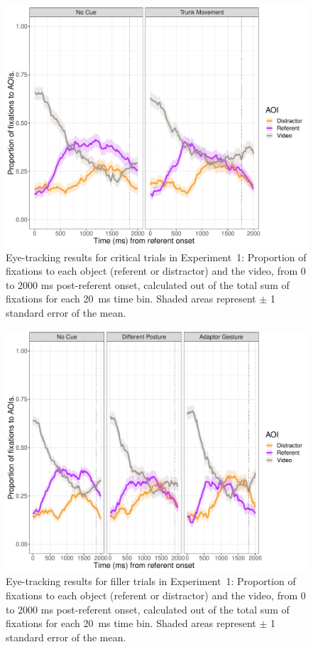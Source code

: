 \documentclass[a4paper,man,natbib]{apa6}
\begin{document}
\begin{figure}[Ht]
  \centering
	\includegraphics[width=\linewidth]{./img/e7_fixations_crit.pdf}
  \caption{Eye-tracking results for critical trials in Experiment~1: Proportion of fixations to each object (referent or distractor) and the video, from 0 to 2000 ms post-referent onset, calculated out of the total sum of fixations for each 20~ms time bin. Shaded areas represent $\pm$ 1 standard error of the mean.}
  \label{fig:v1_eye1}
\end{figure}

\begin{figure}[Ht]
  \centering
	\includegraphics[width=\linewidth]{./img/e7_fixations_filler.pdf}
  \caption{Eye-tracking results for filler trials in Experiment~1: Proportion of fixations to each object (referent or distractor) and the video, from 0 to 2000 ms post-referent onset, calculated out of the total sum of fixations for each 20~ms time bin. Shaded areas represent $\pm$ 1 standard error of the mean.}
  \label{fig:v1_eye2}
\end{figure}
\end{document}
